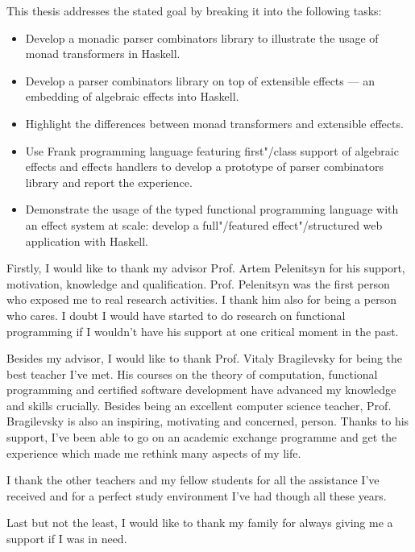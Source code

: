This thesis addresses the stated goal by breaking it into the following tasks:

\begin{itemize}
  \item Develop a monadic parser combinators library to illustrate the usage of
  monad transformers in Haskell.
  \item Develop a parser combinators library on top of extensible effects --- an embedding of
  algebraic effects into Haskell.
  \item Highlight the differences between monad transformers and extensible effects.
  \item Use Frank programming language
  featuring first"/class support of algebraic effects and effects handlers to develop
  a prototype of parser combinators library and report the experience.
  \item Demonstrate the usage of the typed functional programming language with an
  effect system at scale: develop a full"/featured effect"/structured web application
  with Haskell.
\end{itemize}

\Ackns

Firstly, I would like to thank my advisor Prof. Artem Pelenitsyn for his support, motivation,
knowledge and qualification. Prof. Pelenitsyn was the first person who exposed me to real
research activities. I thank him also for being a person who cares. I doubt I would have started
to do research on functional programming if I wouldn't have his support at one critical moment
in the past.

Besides my advisor, I would like to thank Prof. Vitaly Bragilevsky for being the best teacher
I've met. His courses on the theory of computation, functional programming and certified
software development have advanced my knowledge and skills crucially. Besides being an excellent
computer science teacher, Prof. Bragilevsky is also an inspiring, motivating and concerned,
person. Thanks to his support, I've been able to go on an academic exchange programme and get
the experience which made me rethink many aspects of my life.

I thank the other teachers and my fellow students for all the assistance I've received and for a
perfect study environment I've had though all these years.

Last but not the least, I would like to thank my family for always giving me a support if I was
in need.